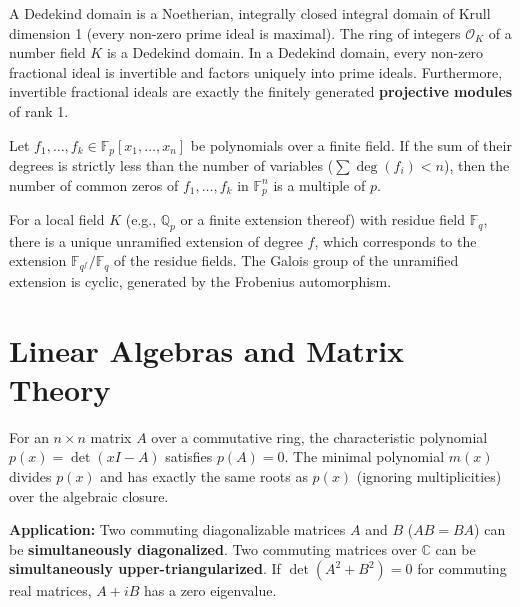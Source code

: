 \begin{definition}
A Dedekind domain is a Noetherian, integrally closed integral domain of Krull dimension 1 (every non-zero prime ideal is maximal). The ring of integers $\mathcal{O}_K$ of a number field $K$ is a Dedekind domain. In a Dedekind domain, every non-zero fractional ideal is invertible and factors uniquely into prime ideals. Furthermore, invertible fractional ideals are exactly the finitely generated \textbf{projective modules} of rank 1.
\end{definition}

\begin{theorem}
Let $f_1, \dots, f_k \in \mathbb{F}_p[x_1, \dots, x_n]$ be polynomials over a finite field. If the sum of their degrees is strictly less than the number of variables ($\sum \deg(f_i) < n$), then the number of common zeros of $f_1, \dots, f_k$ in $\mathbb{F}_p^n$ is a multiple of $p$.
\end{theorem}

\begin{remark}
For a local field $K$ (e.g., $\mathbb{Q}_p$ or a finite extension thereof) with residue field $\mathbb{F}_q$, there is a unique unramified extension of degree $f$, which corresponds to the extension $\mathbb{F}_{q^f} / \mathbb{F}_q$ of the residue fields. The Galois group of the unramified extension is cyclic, generated by the Frobenius automorphism.
\end{remark}

\section{Linear Algebras and Matrix Theory}

\begin{theorem}
For an $n \times n$ matrix $A$ over a commutative ring, the characteristic polynomial $p(x) = \det(xI - A)$ satisfies $p(A) = 0$. The minimal polynomial $m(x)$ divides $p(x)$ and has exactly the same roots as $p(x)$ (ignoring multiplicities) over the algebraic closure.

\textbf{Application:} Two commuting diagonalizable matrices $A$ and $B$ ($AB=BA$) can be \textbf{simultaneously diagonalized}. Two commuting matrices over $\mathbb{C}$ can be \textbf{simultaneously upper-triangularized}. If $\det(A^2+B^2)=0$ for commuting real matrices, $A+iB$ has a zero eigenvalue.
\end{theorem}

